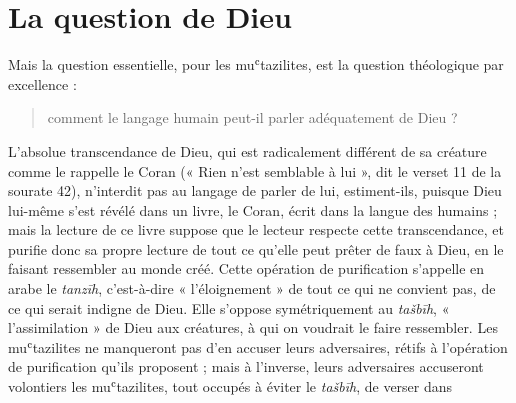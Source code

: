 \hypertarget{la-question-de-dieu}{%
\section{La question de Dieu}\label{la-question-de-dieu}}

Mais la question essentielle, pour les muʿtazilites, est la question
théologique par excellence : 
\begin{quote}
    comment le langage humain peut-il parler
adéquatement de Dieu ?
\end{quote}
 L'absolue transcendance de Dieu, qui est
radicalement différent de sa créature comme le rappelle le Coran (« Rien
n'est semblable à lui », dit le verset 11 de la sourate 42), n'interdit
pas au langage de parler de lui, estiment-ils, puisque Dieu lui-même
s'est révélé dans un livre, le Coran, écrit dans la langue des humains ;
mais la lecture de ce livre suppose que le lecteur respecte cette
transcendance, et purifie donc sa propre lecture de tout ce qu'elle peut
prêter de faux à Dieu, en le faisant ressembler au monde créé. Cette
opération de purification s'appelle en arabe le \emph{tanzīh}, c'est-à-dire « l'éloignement » de tout ce qui ne convient pas, de ce qui
serait indigne de Dieu. Elle s'oppose symétriquement au \emph{tašbīh},
« l'assimilation » de Dieu aux créatures, à qui on voudrait le faire
ressembler. Les muʿtazilites ne manqueront pas d'en accuser leurs
adversaires, rétifs à l'opération de purification qu'ils proposent ;
mais à l'inverse, leurs adversaires accuseront volontiers les
muʿtazilites, tout occupés à éviter le \emph{tašbīh}, de verser dans
